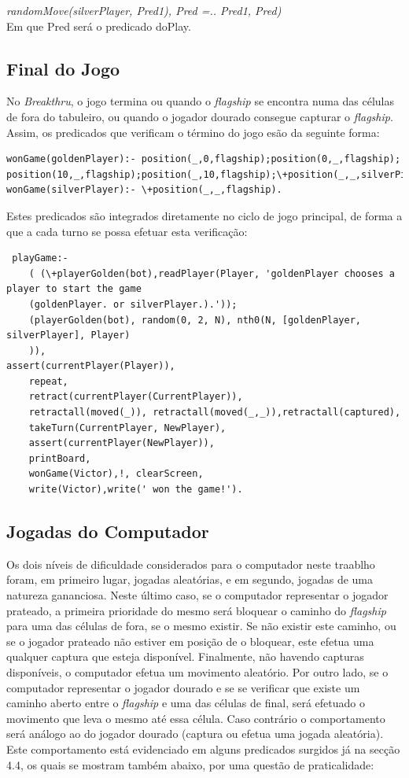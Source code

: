 \documentclass[a4paper]{article}
\begin{document}
\textit{randomMove(silverPlayer, Pred1), Pred =.. Pred1, Pred)}\\

Em que Pred será o predicado doPlay.

\subsection{Final do Jogo}

No \textit{Breakthru}, o jogo termina ou quando o \textit{flagship} se encontra numa das células de fora do tabuleiro, ou quando o jogador dourado consegue capturar o \textit{flagship}. Assim, os predicados que verificam o término do jogo esão da seguinte forma:

\begin{verbatim}
wonGame(goldenPlayer):- position(_,0,flagship);position(0,_,flagship);
position(10,_,flagship);position(_,10,flagship);\+position(_,_,silverPiece).
wonGame(silverPlayer):- \+position(_,_,flagship).
\end{verbatim}

Estes predicados são integrados diretamente no ciclo de jogo principal, de forma a que a cada turno se possa efetuar esta verificação:

\begin{verbatim}
 playGame:-
	( (\+playerGolden(bot),readPlayer(Player, 'goldenPlayer chooses a player to start the game
	(goldenPlayer. or silverPlayer.).'));
	(playerGolden(bot), random(0, 2, N), nth0(N, [goldenPlayer, silverPlayer], Player)
	)),
assert(currentPlayer(Player)),
	repeat,
	retract(currentPlayer(CurrentPlayer)),
	retractall(moved(_)), retractall(moved(_,_)),retractall(captured),
	takeTurn(CurrentPlayer, NewPlayer),
	assert(currentPlayer(NewPlayer)),
	printBoard,
	wonGame(Victor),!, clearScreen,
	write(Victor),write(' won the game!').
\end{verbatim}

\subsection{Jogadas do Computador}
Os dois níveis de dificuldade considerados para o computador neste traablho foram, em primeiro lugar, jogadas aleatórias, e em segundo, jogadas de uma natureza gananciosa. Neste último caso, se o computador representar o jogador prateado, a primeira prioridade do mesmo será bloquear o caminho do \textit{flagship} para uma das células de fora, se o mesmo existir. Se não existir este caminho, ou se o jogador prateado não estiver em posição de o bloquear, este efetua uma qualquer captura que esteja disponível. Finalmente, não havendo capturas disponíveis, o computador efetua um movimento aleatório.
Por outro lado, se o computador representar o jogador dourado e se se verificar que existe um caminho aberto entre o \textit{flagship} e uma das células de final, será efetuado o movimento que leva o mesmo até essa célula. Caso contrário o comportamento será análogo ao do jogador dourado (captura ou efetua uma jogada aleatória). Este comportamento está evidenciado em alguns predicados surgidos já na secção 4.4, os quais se mostram também abaixo, por uma questão de praticalidade:
\end{document}
